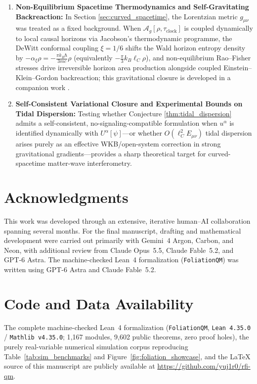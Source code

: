 \documentclass[11pt, a4paper]{article}
\theoremstyle{definition}
\begin{document}
\begin{enumerate}[label=\arabic*., itemsep=0.35em]
    \item \textbf{Non-Equilibrium Spacetime Thermodynamics and Self-Gravitating Backreaction:} In Section \ref{sec:curved_spacetime}, the Lorentzian metric $g_{\mu\nu}$ was treated as a fixed background. When $\mathcal{A}_g[\rho, \tau_{\text{clock}}]$ is coupled dynamically to local causal horizons via Jacobson's thermodynamic programme, the DeWitt conformal coupling $\xi = 1/6$ shifts the Wald horizon entropy density by $-\alpha_\xi\rho = -\frac{\pi k_B\hbar}{3mc}\rho$ (equivalently $-\frac{\pi}{3}k_B\ell_C\rho$), and non-equilibrium Rao--Fisher stresses drive irreversible horizon area production alongside coupled Einstein--Klein--Gordon backreaction; this gravitational closure is developed in a companion work \cite{KiiskinenPaper2}.
    \item \textbf{Self-Consistent Variational Closure and Experimental Bounds on Tidal Dispersion:} Testing whether Conjecture \ref{thm:tidal_dispersion} admits a self-consistent, no-signaling-compatible formulation \cite{Gisin1990} when $u^\alpha$ is identified dynamically with $U^\alpha[\psi]$---or whether $O(\ell_C^2 E_{\mu\nu})$ tidal dispersion arises purely as an effective WKB/open-system correction in strong gravitational gradients---provides a sharp theoretical target for curved-spacetime matter-wave interferometry.
\end{enumerate}

\section*{Acknowledgments}

This work was developed through an extensive, iterative human--AI collaboration spanning several months. For the final manuscript, drafting and mathematical development were carried out primarily with Gemini~4 Argon, Carbon, and Neon, with additional review from Claude Opus~5.5, Claude Fable~5.2, and GPT-6 Astra. The machine-checked Lean~4 formalization (\texttt{FoliationQM}) was written using GPT-6 Astra and Claude Fable~5.2.

\section*{Code and Data Availability}

The complete machine-checked Lean~4 formalization (\texttt{FoliationQM}, \texttt{Lean 4.35.0} / \texttt{Mathlib v4.35.0}; 1{,}167 modules, 9{,}602 public theorems, zero proof holes), the purely real-variable numerical simulation corpus reproducing Table~\ref{tab:sim_benchmarks} and Figure~\ref{fig:foliation_showcase}, and the \LaTeX{} source of this manuscript are publicly available at \url{https://github.com/yuj1r0/rfi-qm}.
\end{document}
